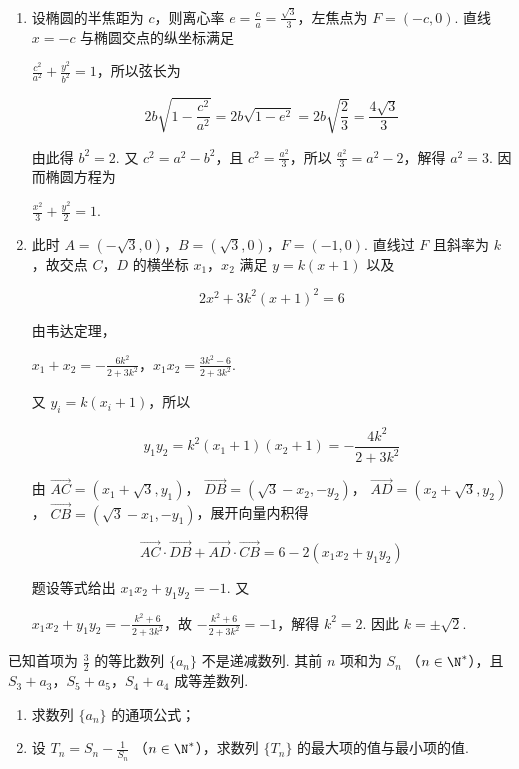 \begin{solution}
\begin{enumerate}
\item 设椭圆的半焦距为 \(c\)，则离心率 \(e=\frac{c}{a}=\frac{\sqrt{3}}{3}\)，左焦点为 \(F=(-c,0)\). 直线 \(x=-c\) 与椭圆交点的纵坐标满足

\(\frac{c^2}{a^2}+\frac{y^2}{b^2}=1\)，所以弦长为

\[
2b\sqrt{1-\frac{c^2}{a^2}}=2b\sqrt{1-e^2}=2b\sqrt{\frac{2}{3}}=\frac{4\sqrt{3}}{3}
\]

由此得 \(b^2=2\). 又 \(c^2=a^2-b^2\)，且 \(c^2=\frac{a^2}{3}\)，所以 \(\frac{a^2}{3}=a^2-2\)，解得 \(a^2=3\). 因而椭圆方程为

\(\frac{x^2}{3}+\frac{y^2}{2}=1\).

\item 此时 \(A=(-\sqrt{3},0)\)，\(B=(\sqrt{3},0)\)，\(F=(-1,0)\). 直线过 \(F\) 且斜率为 \(k\)，故交点 \(C\)，\(D\) 的横坐标 \(x_1\)，\(x_2\) 满足 \(y=k(x+1)\) 以及

\[
2x^2+3k^2(x+1)^2=6
\]

由韦达定理，

\(x_1+x_2=-\frac{6k^2}{2+3k^2}\)，\(x_1x_2=\frac{3k^2-6}{2+3k^2}\).

又 \(y_i=k(x_i+1)\)，所以

\[
y_1y_2=k^2(x_1+1)(x_2+1)=-\frac{4k^2}{2+3k^2}
\]

由
\(\overrightarrow{AC}=(x_1+\sqrt{3},y_1)\)，
\(\overrightarrow{DB}=(\sqrt{3}-x_2,-y_2)\)，
\(\overrightarrow{AD}=(x_2+\sqrt{3},y_2)\)，
\(\overrightarrow{CB}=(\sqrt{3}-x_1,-y_1)\)，展开向量内积得

\[
\overrightarrow{AC}\cdot\overrightarrow{DB}+\overrightarrow{AD}\cdot\overrightarrow{CB}=6-2(x_1x_2+y_1y_2)
\]

题设等式给出 \(x_1x_2+y_1y_2=-1\). 又

\(x_1x_2+y_1y_2=-\frac{k^2+6}{2+3k^2}\)，故 \(-\frac{k^2+6}{2+3k^2}=-1\)，解得 \(k^2=2\). 因此 \(k=\pm\sqrt{2}\).
\end{enumerate}
\end{solution}

\begin{problem}
已知首项为 \(\frac{3}{2}\) 的等比数列 \(\{a_{n}\}\) 不是递减数列. 其前 \(n\) 项和为 \(S_{n}\) （\(n \in \N^{*}\)），且 \(S_{3} + a_{3}\)，\(S_{5} + a_{5}\)，\(S_{4} + a_{4}\) 成等差数列.
\begin{enumerate}
\item 求数列 \( \{a_{n}\} \) 的通项公式；
\item 设 \(T_{n} = S_{n} - \frac{1}{S_{n}}\) （\(n \in \N^{*}\)），求数列 \(\{T_{n}\}\) 的最大项的值与最小项的值.
\end{enumerate}
\end{problem}

